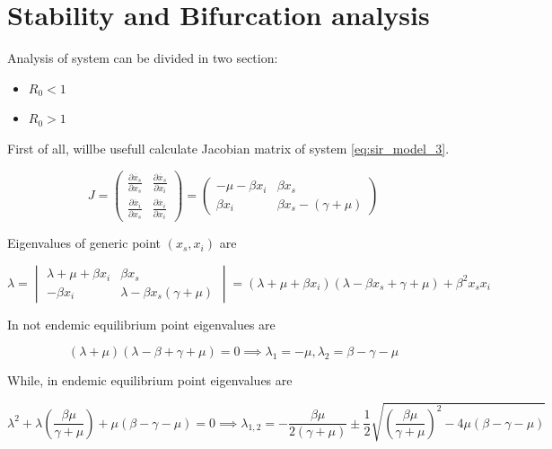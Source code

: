 \section{Stability and Bifurcation analysis}
Analysis of system can be divided in two section:
\begin{itemize}
    \item $R_0 < 1$
    \item $R_0 > 1$
\end{itemize}



First of all, willbe usefull calculate Jacobian matrix of system \ref{eq:sir_model_3}.

\begin{equation}
    J = 
    \begin{pmatrix}
        \frac{\partial \dot{x_s}}{\partial x_s} & \frac{\partial \dot{x_s}}{\partial x_i} \\
        \frac{\partial \dot{x_i}}{\partial x_s} & \frac{\partial \dot{x_i}}{\partial x_i}
    \end{pmatrix} =
    \begin{pmatrix}
        -\mu-\beta x_i & \beta x_s \\ \beta x_i & \beta x_s -(\gamma + \mu)
    \end{pmatrix}
\end{equation}

Eigenvalues of generic point $(x_s,x_i)$ are

\begin{equation}
    \label{eq:eigenvalues}
    \lambda = 
    \begin{vmatrix}
        \lambda + \mu + \beta x_i & \beta x_s \\
        -\beta x_i & \lambda - \beta x_s  (\gamma + \mu)
    \end{vmatrix}
    = (\lambda + \mu + \beta x_i)(\lambda - \beta x_s + \gamma + \mu ) + \beta^2 x_s x_i
\end{equation}

In not endemic equilibrium point eigenvalues are

\begin{equation}
    \label{eq:eigenvalues_ne}
    (\lambda + \mu)(\lambda - \beta + \gamma + \mu) = 0 \implies \lambda_1 = - \mu, \lambda_2 = \beta-\gamma-\mu
\end{equation}

While, in endemic equilibrium point eigenvalues are

\begin{equation}
    \label{eq:eigenvalues_e}
    \lambda^2+\lambda\left(\frac{\beta\mu}{\gamma + \mu}\right)+\mu(\beta-\gamma-\mu) = 0 \implies \lambda_{1,2} = -\frac{\beta\mu}{2(\gamma + \mu)} \pm \frac{1}{2}\sqrt{\left(\frac{\beta\mu}{\gamma + \mu}\right)^2-4\mu(\beta-\gamma-\mu)}
\end{equation}

